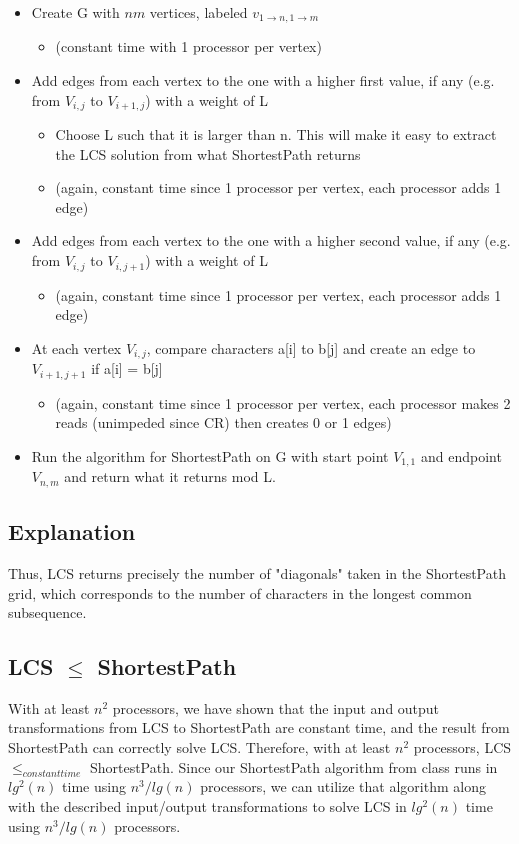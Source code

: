 \documentclass[a4paper]{article}
\begin{document}
\begin{itemize}
    \item Create G with $nm$ vertices, labeled $v_{1 \rightarrow n,1 \rightarrow m}$
    \begin{itemize}
        \item (constant time with 1 processor per vertex)
    \end{itemize}
    \item Add edges from each vertex to the one with a higher first value, if any (e.g. from $V_{i,j}$ to $V_{i+1,j}$) with a weight of L
    \begin{itemize}
        \item Choose L such that it is larger than n. This will make it easy to extract the LCS solution from what ShortestPath returns
        \item (again, constant time since 1 processor per vertex, each processor adds 1 edge)
    \end{itemize}
    \item Add edges from each vertex to the one with a higher second value, if any (e.g. from $V_{i,j}$ to $V_{i,j+1}$) with a weight of L
    \begin{itemize}
        \item (again, constant time since 1 processor per vertex, each processor adds 1 edge)
    \end{itemize}
    \item At each vertex $V_{i,j}$, compare characters a[i] to b[j] and create an edge to $V_{i+1,j+1}$ if a[i] = b[j]
    \begin{itemize}
        \item (again, constant time since 1 processor per vertex, each processor makes 2 reads (unimpeded since CR) then creates 0 or 1 edges)
    \end{itemize}
    \item Run the algorithm for ShortestPath on G with start point $V_{1,1}$ and endpoint $V_{n,m}$ and return what it returns mod L.
\end{itemize}

\subsection{Explanation}

Thus, LCS returns precisely the number of "diagonals" taken in the ShortestPath grid, which corresponds to the number of characters in the longest common subsequence.


\subsection{LCS $\leq$ ShortestPath}
With at least $n^2$ processors, we have shown that the input and output transformations from LCS to ShortestPath are constant time, and the result from ShortestPath can correctly solve LCS. Therefore, with at least $n^2$ processors, LCS $\leq _{constant time}$ ShortestPath. Since our ShortestPath algorithm from class runs in $lg^2(n)$ time using $n^3/lg(n)$ processors, we can utilize that algorithm along with the described input/output transformations to solve LCS in $lg^2(n)$ time using $n^3/lg(n)$ processors.
\end{document}
